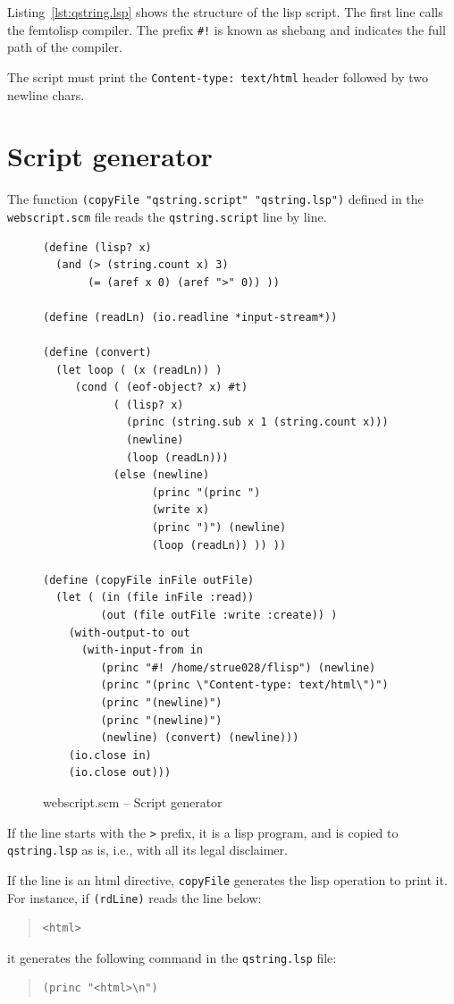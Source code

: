 \documentclass[a4paper,12pt]{book}
\begin{document}
Listing~\ref{lst:qstring.lsp} shows
the structure of the lisp script.
The first line calls the femtolisp
compiler. The prefix \verb|#!|
is known as shebang and indicates
the full path of the compiler.

The script must print the
\verb|Content-type: text/html| header
followed by two newline chars.

\section{Script generator}

The function \verb|(copyFile "qstring.script" "qstring.lsp")|
defined in the \verb|webscript.scm| file reads the
\verb|qstring.script| line by line.

\begin{figure}[!h]
\begin{verbatim}
(define (lisp? x)
  (and (> (string.count x) 3)
       (= (aref x 0) (aref ">" 0)) ))

(define (readLn) (io.readline *input-stream*))

(define (convert)
  (let loop ( (x (readLn)) )
     (cond ( (eof-object? x) #t)
           ( (lisp? x)
             (princ (string.sub x 1 (string.count x))) 
             (newline)
             (loop (readLn))) 
           (else (newline)
                 (princ "(princ ")
                 (write x)
                 (princ ")") (newline)
                 (loop (readLn)) )) ))

(define (copyFile inFile outFile)
  (let ( (in (file inFile :read))
         (out (file outFile :write :create)) )
    (with-output-to out
      (with-input-from in   
         (princ "#! /home/strue028/flisp") (newline)
         (princ "(princ \"Content-type: text/html\")")
         (princ "(newline)")
         (princ "(newline)")
         (newline) (convert) (newline)))
    (io.close in)
    (io.close out)))
\end{verbatim}
\caption{webscript.scm -- Script generator}
\label{lst:webscript.scm}
\end{figure}



 If the line
starts with the \verb|>| prefix, it is a lisp
program, and is copied to \verb|qstring.lsp| as is,
i.e., with all its legal disclaimer.

If the line is an html directive, \verb|copyFile|
generates the lisp operation to print it. For instance,
if \verb|(rdLine)| reads the line below:
\begin{quote}
\begin{verbatim}
<html>
\end{verbatim}
\end{quote}
it generates the following command in the
\verb|qstring.lsp| file:
\begin{quote}
\begin{verbatim}
(princ "<html>\n")
\end{verbatim}
\end{quote}
\end{document}
